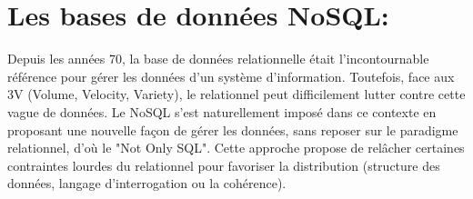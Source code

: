 \section{Les bases de données NoSQL:}
Depuis les années 70, la base de données relationnelle était l'incontournable référence pour gérer les données d'un système d'information. Toutefois, face aux 3V (Volume, Velocity, Variety), le relationnel peut difficilement lutter contre cette vague de données. Le NoSQL s'est naturellement imposé dans ce contexte en proposant une nouvelle façon de gérer les données, sans reposer sur le paradigme relationnel, d'où le "Not Only SQL". Cette approche propose de relâcher certaines contraintes lourdes du relationnel pour favoriser la distribution (structure des données, langage d'interrogation ou la cohérence).


\newpage


\newpage

\newpage


\newpage



